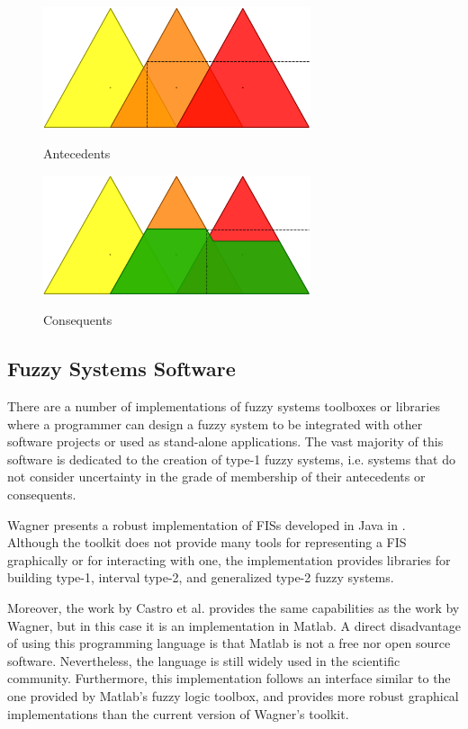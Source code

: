 \begin{figure}
\caption{Antecedents}
\centering
\includegraphics[width=0.7\textwidth]{img/antecedents.png}
\label{figure:antecedents}
\end{figure}

\begin{figure}
\caption{Consequents}
\centering
\includegraphics[width=0.7\textwidth]{img/consequents.png}
\label{figure:consequents}
\end{figure}

\subsection{Fuzzy Systems Software}
\label{subsection:fuzzy-systems-software}

There are a number of implementations of fuzzy systems toolboxes or libraries
where a programmer can design a fuzzy system to be integrated with other
software projects or used as stand-alone applications. The vast majority of this
software is dedicated to the creation of type-1 fuzzy systems, i.e. systems that
do not consider uncertainty in the grade of membership of their antecedents or
consequents.

Wagner presents a robust implementation of FISs developed in Java in
\cite{Wagner2013}. Although the toolkit does not provide many tools
for representing a FIS graphically or for interacting with one, the
implementation provides libraries for building type-1, interval type-2, and
generalized type-2 fuzzy systems.

Moreover, the work by Castro et al. \cite{castro2007interval} provides the same
capabilities as the work by Wagner, but in this case it is an implementation in
Matlab. A direct disadvantage of using this programming language is that Matlab
is not a free nor open source software.  Nevertheless, the language is still
widely used in the scientific community. Furthermore, this implementation
follows an interface similar to the one provided by Matlab's fuzzy logic
toolbox, and provides more robust graphical implementations than the current
version of Wagner's toolkit.

